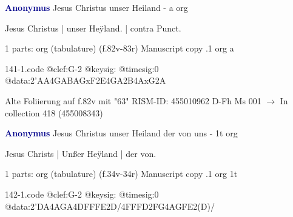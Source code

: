 \documentclass[twocolumn]{book}
\begin{document}
\newline \par \vspace{7pt} \textcolor{darkblue}{\textbf{Anonymus  }}
\newline Jesus Christus unser Heiland - a
\newline org
\newline \begin{itshape}[f.82v, at left:] Jesus Christus | unser Heÿland. | contra Punct.\end{itshape} 
\newline \textcolor{darkblue}{}  1 parts: org (tabulature)  (f.82v-83r)
\newline Manuscript copy
.1  org  a  
\begin{filecontents*}{141-1.code}
@clef:G-2
@keysig:
@timesig:0
@data:2'AA4GABAGxF2E4GA2B4AxG2A
\end{filecontents*}
\newline
%

\newline Alte Foliierung auf f.82v mit "63"
\newline RISM-ID: 455010962
\newline D-Fh  Ms 001
\newline $\rightarrow$ In collection 418 (455008343)
      
\newline \par \vspace{7pt} \textcolor{darkblue}{\textbf{Anonymus  }}
\newline Jesus Christus unser Heiland der von uns - 1t
\newline org
\newline \begin{itshape}[f.35r, at left:] Jesus Christs | Unßer Heÿland | der von.\end{itshape} 
\newline \textcolor{darkblue}{}  1 parts: org (tabulature)  (f.34v-34r)
\newline Manuscript copy
.1  org  1t  
\begin{filecontents*}{142-1.code}
@clef:G-2
@keysig:
@timesig:0
@data:2'DA4AGA4DFFFE2D/4FFFD2FG4AGFE2(D)/
\end{filecontents*}
\newline
%
\end{document}
